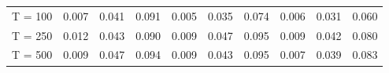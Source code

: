 % 
\begin{tabular}{cccccccccc}
  \hline
  \hline
T = 100 & 0.007 & 0.041 & 0.091 & 0.005 & 0.035 & 0.074 & 0.006 & 0.031 & 0.060 \\ 
  T = 250 & 0.012 & 0.043 & 0.090 & 0.009 & 0.047 & 0.095 & 0.009 & 0.042 & 0.080 \\ 
  T = 500 & 0.009 & 0.047 & 0.094 & 0.009 & 0.043 & 0.095 & 0.007 & 0.039 & 0.083 \\ 
   \hline
\end{tabular}
